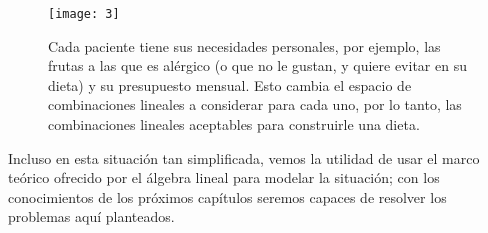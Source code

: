 \begin{figure}[H]
\centering\captionsetup{format = hang}
	\begin{measuredfigure}
		\texttt{[image: 3]} 
		\caption{Cada paciente tiene sus necesidades personales,
		por ejemplo, las frutas a las que es alérgico (o que no le
		gustan, y quiere evitar en su dieta) y su presupuesto mensual.
		Esto cambia el espacio de combinaciones lineales a considerar
		para cada uno, por lo tanto, las combinaciones lineales aceptables
		para construirle una dieta.}
 	\end{measuredfigure}
 \end{figure}

Incluso en esta situación tan simplificada, vemos la utilidad
de usar el marco teórico ofrecido por el álgebra lineal para
modelar la situación; con los conocimientos de los próximos
capítulos seremos capaces de resolver los problemas
aquí planteados. 